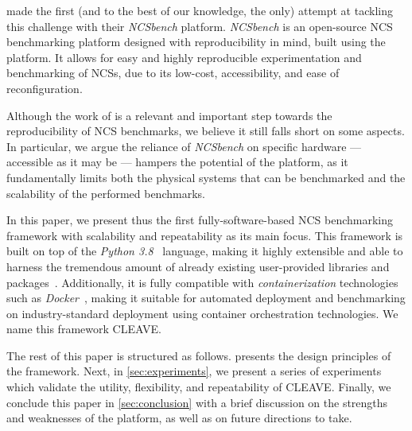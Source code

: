 \textcite{Zoppi2020NCSBench} made the first (and to the best of our knowledge, the only) attempt at tackling this challenge with their \emph{NCSbench} platform.
\emph{NCSbench} is an open-source \ac{NCS} benchmarking platform designed with reproducibility in mind, built using the ~\cite{LEGOMindstormsEV3} platform.
It allows for easy and highly reproducible experimentation and benchmarking of \acp{NCS}, due to its low-cost, accessibility, and ease of reconfiguration.

Although the work of \textcite{Zoppi2020NCSBench} is a relevant and important step towards the reproducibility of \ac{NCS} benchmarks, we believe it still falls short on some aspects.
In particular, we argue the reliance of \emph{NCSbench} on specific hardware --- accessible as it may be --- hampers the potential of the platform, as it fundamentally limits both the physical systems that can be benchmarked and the scalability of the performed benchmarks.

In this paper, we present thus the first fully-software-based \ac{NCS} benchmarking framework with scalability and repeatability as its main focus.
This framework is built on top of the \emph{Python 3.8}~\cite{Python3.8} language, making it highly extensible and able to harness the tremendous amount of already existing user-provided libraries and packages~\cite{pypi}.
Additionally, it is fully compatible with \emph{containerization} technologies such as \emph{Docker}~\cite{merkel2014docker}, making it suitable for automated deployment and benchmarking on industry-standard deployment using container orchestration technologies.
We name this framework \ac{CLEAVE}.

The rest of this paper is structured as follows.
 presents the design principles of the framework.
Next, in \cref{sec:experiments}, we present a series of experiments which validate the utility, flexibility, and repeatability of \ac{CLEAVE}.
Finally, we conclude this paper in \cref{sec:conclusion} with a brief discussion on the strengths and weaknesses of the platform, as well as on future directions to take.